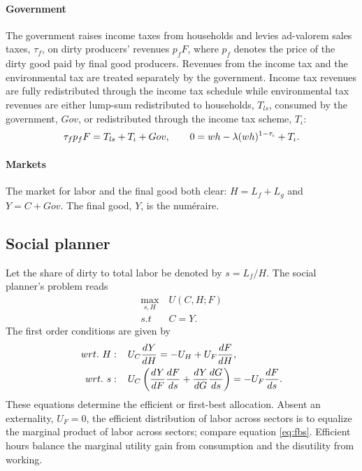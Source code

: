 \paragraph{Government}
The government raises income taxes from households and levies ad-valorem sales taxes, $\tau_f$, on dirty producers' revenues $p_fF$, where $p_f$ denotes the price of the dirty good paid by final good producers. Revenues from the income tax and the environmental tax are treated separately by the government. Income tax revenues are fully redistributed through the income tax schedule while environmental tax revenues are either lump-sum redistributed to households, $T_{ls}$, consumed by the government, $Gov$, or redistributed through the income tax scheme, $T_\iota$:
\begin{align}
\tau_{f}p_fF=T_{ls}+T_\iota+Gov, \hspace{7mm}
0={w h}-\lambda(w h)^{1-\tau_{\iota}}+T_\iota.
\end{align}

\paragraph{Markets}
The market for labor and the final good both clear: $H=L_f+L_g$ and $Y=C+Gov$. The final good, $Y$, is the numéraire.

\subsection{Social planner}
Let the share of dirty to total labor be denoted by $s=L_f/H$. The social planner's problem reads
\begin{align}
\underset{s, H}{\max}\ & U(C,H; F)\\ s.t\ \ & C=Y.
\end{align}
The first order conditions are given by
\begin{align}
wrt.\ H:\hspace{4mm} & U_C\frac{dY}{dH}=-U_H+U_F\frac{dF}{dH}\label{eq:fbh},\\
wrt.\ s:\hspace{4mm} & U_C\left(\frac{dY}{dF}\frac{dF}{ds}+\frac{dY}{dG}\frac{dG}{ds}\right)=-U_F\frac{dF}{ds}. \label{eq:fbs}
\end{align}
These equations determine the efficient or first-best allocation. 
Absent an externality, $U_F=0$, the efficient distribution of labor across sectors is to equalize the marginal product of labor across sectors; compare equation \ref{eq:fbs}. Efficient hours balance the marginal utility gain from consumption and the disutility from working. 

